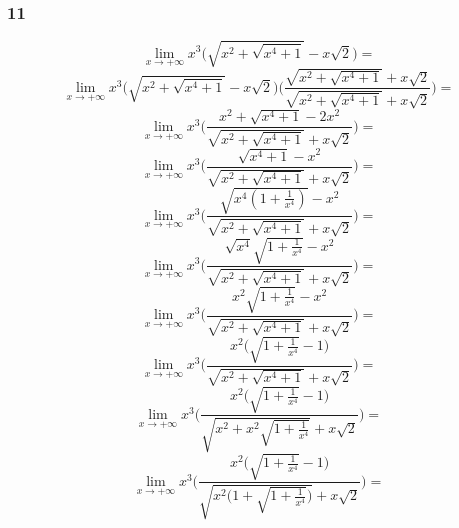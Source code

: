 \documentclass{article}
\begin{document}
\subsubsection*{11}
\begin{equation*}
    \lim_{x \to + \infty} x^{3}\Bigg(\sqrt{x^{2} + \sqrt{x^{4} + 1}} - x\sqrt{2}\Bigg) =
\end{equation*}
\begin{equation*}
    \lim_{x \to + \infty} x^{3}\Bigg(\sqrt{x^{2} + \sqrt{x^{4} + 1}} - x\sqrt{2}\Bigg) \Bigg(\frac{\sqrt{x^{2} + \sqrt{x^{4} + 1}} + x\sqrt{2}}{\sqrt{x^{2} + \sqrt{x^{4} + 1}} + x\sqrt{2}}\Bigg) =
\end{equation*}
\begin{equation*}
    \lim_{x \to + \infty} x^{3} \Bigg(\frac{x^{2} + \sqrt{x^{4} + 1} - 2x^{2}}{\sqrt{x^{2} + \sqrt{x^{4} + 1}} + x\sqrt{2}}\Bigg) =
\end{equation*}
\begin{equation*}
    \lim_{x \to + \infty} x^{3} \Bigg(\frac{ \sqrt{x^{4} + 1} - x^{2}}{\sqrt{x^{2} + \sqrt{x^{4} + 1}} + x\sqrt{2}}\Bigg) =
\end{equation*}
\begin{equation*}
    \lim_{x \to + \infty} x^{3} \Bigg(\frac{ \sqrt{x^{4}(1 + \frac{1}{x^4})} - x^{2}}{\sqrt{x^{2} + \sqrt{x^{4} + 1}} + x\sqrt{2}}\Bigg) =
\end{equation*}
\begin{equation*}
    \lim_{x \to + \infty} x^{3} \Bigg(\frac{ \sqrt{x^{4}} \sqrt{1 + \frac{1}{x^4}} - x^{2}}{\sqrt{x^{2} + \sqrt{x^{4} + 1}} + x\sqrt{2}}\Bigg) =
\end{equation*}
\begin{equation*}
    \lim_{x \to + \infty} x^{3} \Bigg(\frac{ x^2 \sqrt{1 + \frac{1}{x^4}} - x^{2}}{\sqrt{x^{2} + \sqrt{x^{4} + 1}} + x\sqrt{2}}\Bigg) =
\end{equation*}
\begin{equation*}
    \lim_{x \to + \infty} x^{3} \Bigg(\frac{ x^2 \Big(\sqrt{1 + \frac{1}{x^4}} - 1 \Big)}{\sqrt{x^{2} + \sqrt{x^{4} + 1}} + x\sqrt{2}}\Bigg) =
\end{equation*}
\begin{equation*}
    \lim_{x \to + \infty} x^{3} \Bigg(\frac{ x^2 \Big(\sqrt{1 + \frac{1}{x^4}} - 1 \Big)}{\sqrt{x^{2} + x^2 \sqrt{1 + \frac{1}{x^4}}} + x\sqrt{2}}\Bigg) =
\end{equation*}
\begin{equation*}
    \lim_{x \to + \infty} x^{3} \Bigg(\frac{ x^2 \Big(\sqrt{1 + \frac{1}{x^4}} - 1 \Big)}{\sqrt{x^{2} \Big(1 + \sqrt{1 + \frac{1}{x^4}}\Big)} + x\sqrt{2}}\Bigg) =
\end{equation*}
\end{document}
